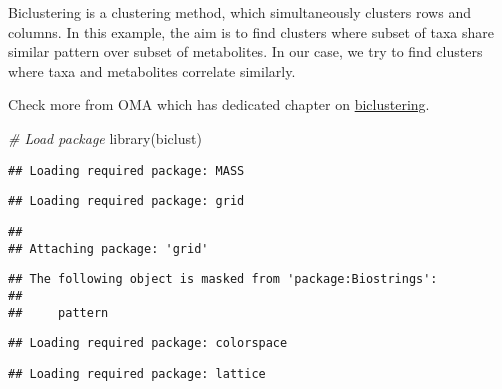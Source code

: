 \documentclass[
  oneside]{book}
\newenvironment{Shaded}{\begin{snugshade}}{\end{snugshade}}
\newcommand{\AttributeTok}[1]{\textcolor[rgb]{0.77,0.63,0.00}{#1}}
\newcommand{\CommentTok}[1]{\textcolor[rgb]{0.56,0.35,0.01}{\textit{#1}}}
\newcommand{\ConstantTok}[1]{\textcolor[rgb]{0.00,0.00,0.00}{#1}}
\newcommand{\DecValTok}[1]{\textcolor[rgb]{0.00,0.00,0.81}{#1}}
\newcommand{\FunctionTok}[1]{\textcolor[rgb]{0.00,0.00,0.00}{#1}}
\newcommand{\NormalTok}[1]{#1}
\newcommand{\OtherTok}[1]{\textcolor[rgb]{0.56,0.35,0.01}{#1}}
\newcommand{\SpecialCharTok}[1]{\textcolor[rgb]{0.00,0.00,0.00}{#1}}
\begin{document}
Biclustering is a clustering method, which simultaneously clusters rows and columns.
In this example, the aim is to find clusters where subset of taxa share similar
pattern over subset of metabolites. In our case, we try to find clusters where
taxa and metabolites correlate similarly.

Check more from OMA which has dedicated chapter on
\href{https://microbiome.github.io/OMA/biclustering.html}{biclustering}.

\begin{Shaded}
\begin{Highlighting}[]
\CommentTok{\# Load package}
\FunctionTok{library}\NormalTok{(biclust)}
\end{Highlighting}
\end{Shaded}

\begin{verbatim}
## Loading required package: MASS
\end{verbatim}

\begin{verbatim}
## Loading required package: grid
\end{verbatim}

\begin{verbatim}
## 
## Attaching package: 'grid'
\end{verbatim}

\begin{verbatim}
## The following object is masked from 'package:Biostrings':
## 
##     pattern
\end{verbatim}

\begin{verbatim}
## Loading required package: colorspace
\end{verbatim}

\begin{verbatim}
## Loading required package: lattice
\end{verbatim}

\begin{Shaded}
\end{Shaded}
\end{document}
